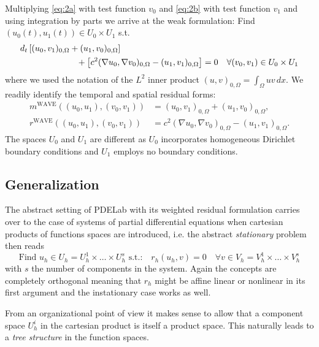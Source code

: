 \documentclass[a4paper,12pt]{article}
\begin{document}
Multiplying \eqref{eq:2a}
with test function $v_0$ and \eqref{eq:2b} with test function $v_1$
and using integration by parts we arrive at the weak formulation: Find $(u_0(t),u_1(t))\in
U_0\times U_1$ s.t.
\begin{equation}
\label{eq:WeakForm}
\begin{split}
d_t &\left[ (u_0,v_1)_{0,\Omega} + (u_1,v_0)_{0,\Omega}\right] \\
&\hspace{20mm}+ \left[ c^2 (\nabla u_0,\nabla v_0)_{0,\Omega} -(u_1,v_1)_{0,\Omega} \right] = 0
\quad \forall (v_0,v_1)\in U_0\times U_1
\end{split}
\end{equation}
where we used the notation of the $L^2$ inner product $(u,v)_{0,\Omega} = \int_\Omega
u v \, dx$.
We readily identify the temporal and spatial residual forms:
\begin{align}
m^{\text{WAVE}}((u_0,u_1),(v_0,v_1)) &= (u_0,v_1)_{0,\Omega} + (u_1,v_0)_{0,\Omega},
\label{eq:TemporalResForm}\\
r^{\text{WAVE}}((u_0,u_1),(v_0,v_1)) &= c^2 (\nabla u_0,\nabla v_0)_{0,\Omega} - (u_1,v_1)_{0,\Omega} . \label{eq:SpatialResForm}
\end{align}
The spaces $U_0$ and $U_1$ are different as $U_0$ incorporates homogeneous
Dirichlet boundary conditions and $U_1$ employs no boundary conditions.

\subsection*{Generalization}

The abstract setting of PDELab with its weighted residual formulation
carries over to the case of systems of
partial differential equations when cartesian products of
functions spaces are introduced, i.e. the abstract \textit{stationary} problem then reads
\begin{equation}
\text{Find $u_h\in U_h=U_h^1\times \ldots \times U_h^s$ s.t.:} \quad r_h(u_h,v)=0
\quad \forall v\in V_h=V_h^1\times\ldots\times V_h^s
\label{Eq:BasicSystemBuildingBlock}
\end{equation}
with $s$ the number of components in the system. Again the concepts
are completely orthogonal meaning that $r_h$ might be affine linear or nonlinear
in its first argument and the instationary case works as well.

From an organizational point of view it makes sense to allow that
a component space $U_h^i$ in the cartesian product is itself
a product space. This naturally leads to a \textit{tree structure} in the
function spaces.
\end{document}
